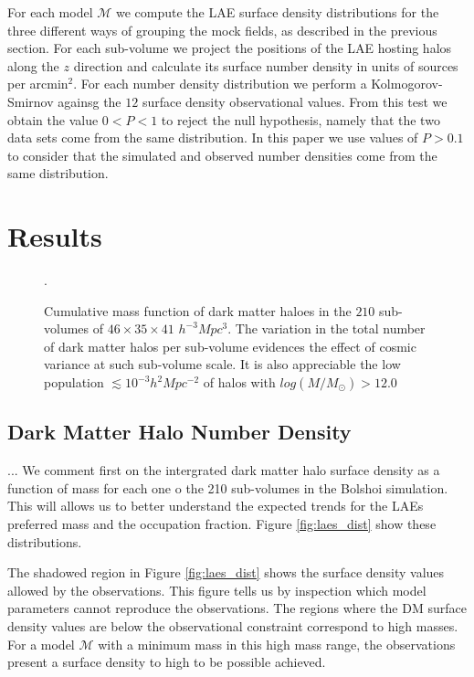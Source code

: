 \documentclass{emulateapj}
\begin{document}
For each model ${\mathcal M}$ we compute the LAE surface density distributions for the three different ways of grouping the mock fields, as described in the previous section. For each sub-volume we project the positions of the LAE hosting halos along the $z$ direction and calculate its surface number density in units of sources per arcmin$^{2}$. For each number density distribution we perform a Kolmogorov-Smirnov againsg the $12$ surface density observational values. From this test we obtain the value $0<P<1$ to reject the null hypothesis, namely that the two data sets come from the same distribution. In this paper we use values of $P>0.1$ to consider that the simulated and observed number densities come from the same distribution.

\section{Results}


\begin{figure}
\begin{center}
\caption{ \label{figure:laes_dist} Cumulative mass function of dark matter haloes in the $210$ sub-volumes of $46\times 35\times 41$ $h^{-3}Mpc^{3}$. The variation in the total number of dark matter halos per sub-volume  evidences the effect of cosmic variance at such sub-volume scale. It is also appreciable the low population $\lesssim10^{-3}h^{2}Mpc^{-2}$ of halos with $log(M/M_{\odot})>12.0$}.
\end{center} 
\end{figure}


\subsection{Dark Matter Halo Number Density}
... We comment first on the intergrated dark matter halo surface density as a function of mass for each one o the 210 sub-volumes in the Bolshoi simulation. This will allows us to better understand the expected trends for the LAEs preferred mass and the occupation fraction. Figure \ref{fig:laes_dist} show these distributions.

The shadowed region in Figure \ref{fig:laes_dist} shows the surface density values allowed by the observations. This figure tells us by inspection which model parameters cannot reproduce the observations. The regions where the DM surface density values are below the observational constraint correspond to high masses. For a model ${\mathcal M}$ with a minimum mass in this high mass range, the observations present a surface density to high to be possible achieved. 
\end{document}
